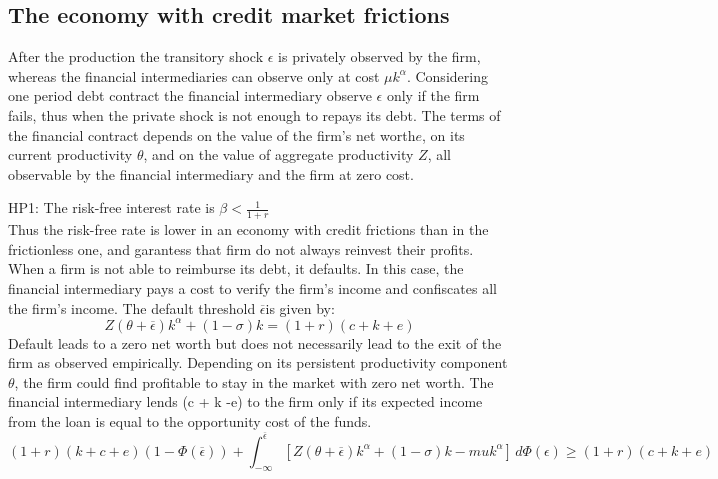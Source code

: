 \documentclass{article}
\begin{document}
\subsection{The economy with credit market frictions}
After the production the transitory shock \(\epsilon\) is privately observed by the firm, whereas the financial
intermediaries can observe only at cost \(\mu k^\alpha\). Considering one period debt contract the financial
intermediary observe \(\epsilon\) only if the firm fails, thus when the private shock is not enough to repays its debt.
The terms of the financial contract depends on the value of the ﬁrm's net worth\(e\), on its current productivity \(\theta\), and on the value of
aggregate productivity \(Z\), all observable by the financial intermediary and the ﬁrm at zero
cost. 
\par
HP1: The risk-free interest rate is \(\beta<\frac{1}{1+r}\) \\
Thus the risk-free rate is lower in an economy with credit frictions than in the frictionless one, and garantess  that
firm do not always reinvest their profits.
When a ﬁrm is not able to reimburse its debt,
it defaults. In this case, the ﬁnancial intermediary pays a cost to verify the ﬁrm's income
and conﬁscates all the ﬁrm's income. The default threshold \(\overline{\epsilon} \)is given by:
\[Z(\theta+\overline{\epsilon} )k^\alpha +(1-\sigma)k = (1+r)(c+k+e)\]
Default leads to a zero net worth but does not necessarily lead to the exit of the ﬁrm
as observed empirically. Depending on its persistent productivity component \(\theta\), the ﬁrm
could ﬁnd proﬁtable to stay in the market with zero net worth.
The ﬁnancial intermediary lends (c + k -e) to the ﬁrm only if its expected income from
the loan is equal to the opportunity cost of the funds. 
\[(1+r)(k+c+e)(1-\Phi(\overline{\epsilon}))+\int_{-\infty}^{\overline{\epsilon}}[Z(\theta+\overline{\epsilon} )k^\alpha
+(1-\sigma)k-mu k^\alpha]  \,d\Phi(\epsilon)\geq (1+r)(c+k+e) \]
\end{document}
